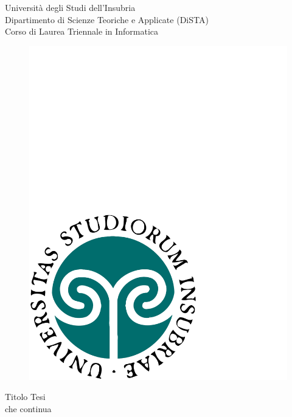 \begin{titlepage}
  \begin{center}
    \begin{large}
      {\fontsize{20}{18}\selectfont\vspace*{0.50cm}Universit\`a degli Studi dell'Insubria}\\
      Dipartimento di Scienze Teoriche e Applicate (DiSTA)\\
      Corso di Laurea Triennale in Informatica
    \end{large}

    \vspace{1cm}
    \begin{figure}[h]
      \begin{center}
        \includegraphics[scale=0.25]{copertina/logounivector.pdf}
      \end{center}
    \end{figure}

      {
        \fontsize{26}{26}\selectfont\par\vspace*{0.75cm}
        Titolo Tesi\\
        \vspace{.15em}che continua
      }
    \par


\end{center}
\end{titlepage}
